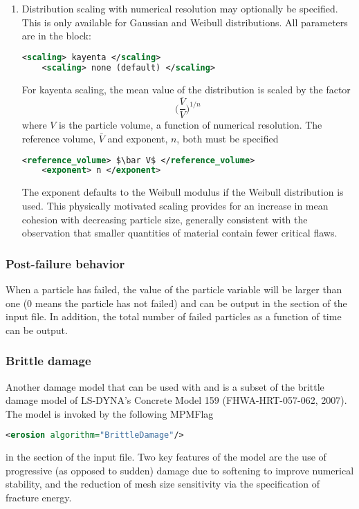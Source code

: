 \begin{enumerate}
\item {}
  Distribution scaling with numerical resolution may optionally be specified.  This is only 
  available for Gaussian and Weibull distributions.  All parameters are in the 
   block:
  \begin{lstlisting}[language=XML]
    <scaling> kayenta </scaling>
    <scaling> none (default) </scaling>
  \end{lstlisting}

  For kayenta scaling, the mean value of the distribution is scaled by the factor
  \begin{equation}
   \biggl(\frac{\bar V}{V}\biggr)^{1/n}
  \end{equation}
  where $V$ is the particle volume, a function of numerical resolution.  The reference volume, 
  $\bar V$ and exponent, $n$, both must be specified
  \begin{lstlisting}[language=XML]
    <reference_volume> $\bar V$ </reference_volume>
    <exponent> n </exponent>
  \end{lstlisting}
  The exponent defaults to the Weibull modulus if the Weibull distribution is used.  This physically
  motivated scaling provides for an increase in mean cohesion with decreasing particle size, generally
  consistent with the observation that smaller quantities of material contain fewer critical flaws.
\end{enumerate}

\subsubsection{Post-failure behavior}
When a particle has failed, the value of the particle variable 
will be larger than one (0 means the particle has not failed) and can be output in the 
 section of the input file. In addition, the total number of failed particles as
a function of time  can be output. 

\subsubsection{Brittle damage}
Another damage model that can be used with  and
 is a subset of the brittle damage model of LS-DYNA's Concrete
 Model 159 (FHWA-HRT-057-062, 2007). The model is invoked by the following MPMFlag
\begin{lstlisting}[language=XML]
  <erosion algorithm="BrittleDamage"/>
\end{lstlisting}
in the  section of the input file. Two key features of the model are the use of
progressive (as opposed to sudden) damage due to softening to improve numerical stability, 
and the reduction of mesh size sensitivity via the specification of fracture energy. 

